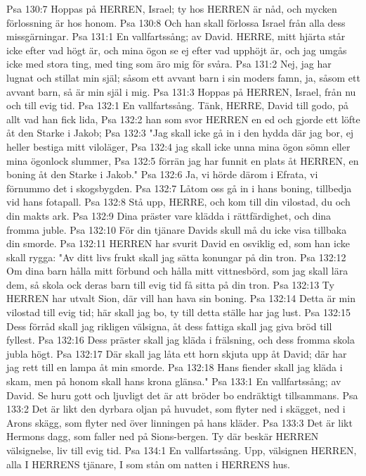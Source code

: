 Psa 130:7  Hoppas på HERREN, Israel; ty hos HERREN är nåd, och mycken förlossning är hos honom.
Psa 130:8  Och han skall förlossa Israel från alla dess missgärningar.
Psa 131:1  En vallfartssång; av David. HERRE, mitt hjärta står icke efter vad högt är, och mina ögon se ej efter vad upphöjt är, och jag umgås icke med stora ting, med ting som äro mig för svåra.
Psa 131:2  Nej, jag har lugnat och stillat min själ; såsom ett avvant barn i sin moders famn, ja, såsom ett avvant barn, så är min själ i mig.
Psa 131:3  Hoppas på HERREN, Israel, från nu och till evig tid.
Psa 132:1  En vallfartssång. Tänk, HERRE, David till godo, på allt vad han fick lida,
Psa 132:2  han som svor HERREN en ed och gjorde ett löfte åt den Starke i Jakob;
Psa 132:3  "Jag skall icke gå in i den hydda där jag bor, ej heller bestiga mitt viloläger,
Psa 132:4  jag skall icke unna mina ögon sömn eller mina ögonlock slummer,
Psa 132:5  förrän jag har funnit en plats åt HERREN, en boning åt den Starke i Jakob."
Psa 132:6  Ja, vi hörde därom i Efrata, vi förnummo det i skogsbygden.
Psa 132:7  Låtom oss gå in i hans boning, tillbedja vid hans fotapall.
Psa 132:8  Stå upp, HERRE, och kom till din vilostad, du och din makts ark.
Psa 132:9  Dina präster vare klädda i rättfärdighet, och dina fromma juble.
Psa 132:10  För din tjänare Davids skull må du icke visa tillbaka din smorde.
Psa 132:11  HERREN har svurit David en osviklig ed, som han icke skall rygga: "Av ditt livs frukt skall jag sätta konungar på din tron.
Psa 132:12  Om dina barn hålla mitt förbund och hålla mitt vittnesbörd, som jag skall lära dem, så skola ock deras barn till evig tid få sitta på din tron.
Psa 132:13  Ty HERREN har utvalt Sion, där vill han hava sin boning.
Psa 132:14  Detta är min vilostad till evig tid; här skall jag bo, ty till detta ställe har jag lust.
Psa 132:15  Dess förråd skall jag rikligen välsigna, åt dess fattiga skall jag giva bröd till fyllest.
Psa 132:16  Dess präster skall jag kläda i frälsning, och dess fromma skola jubla högt.
Psa 132:17  Där skall jag låta ett horn skjuta upp åt David; där har jag rett till en lampa åt min smorde.
Psa 132:18  Hans fiender skall jag kläda i skam, men på honom skall hans krona glänsa."
Psa 133:1  En vallfartssång; av David. Se huru gott och ljuvligt det är att bröder bo endräktigt tillsammans.
Psa 133:2  Det är likt den dyrbara oljan på huvudet, som flyter ned i skägget, ned i Arons skägg, som flyter ned över linningen på hans kläder.
Psa 133:3  Det är likt Hermons dagg, som faller ned på Sions-bergen. Ty där beskär HERREN välsignelse, liv till evig tid.
Psa 134:1  En vallfartssång. Upp, välsignen HERREN, alla I HERRENS tjänare, I som stån om natten i HERRENS hus.
